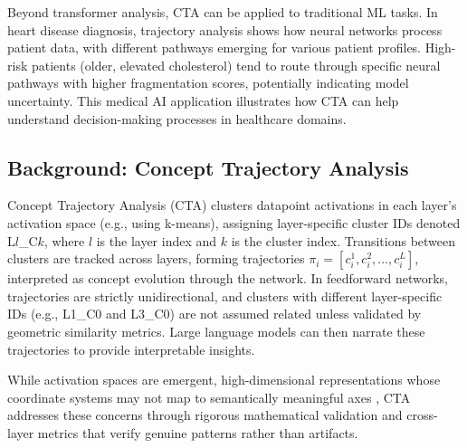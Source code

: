 Beyond transformer analysis, CTA can be applied to traditional ML tasks. In heart disease diagnosis, trajectory analysis shows how neural networks process patient data, with different pathways emerging for various patient profiles. High-risk patients (older, elevated cholesterol) tend to route through specific neural pathways with higher fragmentation scores, potentially indicating model uncertainty. This medical AI application illustrates how CTA can help understand decision-making processes in healthcare domains.

\subsection{Background: Concept Trajectory Analysis}

Concept Trajectory Analysis (CTA) clusters datapoint activations in each layer's activation space (e.g., using k-means), assigning layer-specific cluster IDs denoted L$l$\_C$k$, where $l$ is the layer index and $k$ is the cluster index. Transitions between clusters are tracked across layers, forming trajectories $\pi_i = [c_i^1, c_i^2, \dots, c_i^L]$, interpreted as concept evolution through the network. In feedforward networks, trajectories are strictly unidirectional, and clusters with different layer-specific IDs (e.g., L1\_C0 and L3\_C0) are not assumed related unless validated by geometric similarity metrics. Large language models can then narrate these trajectories to provide interpretable insights.

While activation spaces are emergent, high-dimensional representations whose coordinate systems may not map to semantically meaningful axes \citep{ribeiro2016, lundberg2017}, CTA addresses these concerns through rigorous mathematical validation and cross-layer metrics that verify genuine patterns rather than artifacts.

